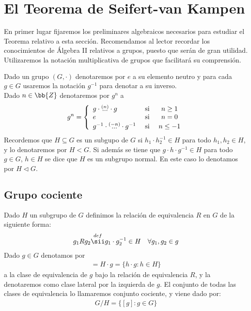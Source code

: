 \section{El Teorema de Seifert-van Kampen}

En primer lugar fijaremos los preliminares algebraicos necesarios para estudiar el Teorema relativo a esta sección. Recomendamos al lector recordar los conocimientos de Álgebra II relativos a grupos, puesto que serán de gran utilidad. Utilizaremos la notación multiplicativa de grupos que facilitará su comprensión.

\begin{notacion}
    Dado un grupo $(G, \cdot)$ denotaremos por $e$ a su elemento neutro y para cada $g\in G$ usaremos la notación $g^{-1}$ para denotar a su inverso.\\

    Dado $n\in \bb{Z}$ denotaremos por $g^n$ a 
    \begin{gather*}
        g^n = \left\{
            \begin{array}{l c c}
                g\cdot \overset{(n)}{...} \cdot g & \text{ si } & n\geq 1\\
                e & \text{ si } & n=0\\
                g^{-1}\cdot \overset{(-n)}{...} \cdot g^{-1} & \text{ si } & n\leq -1
            \end{array}
        \right.
    \end{gather*}
    Recordemos que $H\subseteq G$ es un subgupo de $G$ si $h_1\cdot h_2^{-1}\in H$ para todo $h_1,h_2\in H$, y  lo denotaremos por $H<G$. Si además se tiene que $g\cdot h \cdot g^{-1}\in H$ para todo $g\in G$, $h \in H$ se dice que $H$ es un subgrupo normal. En este caso lo denotamos por $H \lhd G$.
\end{notacion}

\subsection{Grupo cociente}

Dado $H$ un subgrupo de $G$ definimos la relación de equivalencia $R$ en $G$ de la siguiente forma:
\begin{gather*}
    g_1 R g_2 \overset{def}{\sii} g_1\cdot g_2^{-1}\in H\ \ \ \forall g_1,g_2\in g
\end{gather*}
Dado $g\in G$ denotamos por 
\begin{gather*}
    [g]=H\cdot g = \{h\cdot g : h\in H\}
\end{gather*}
a la clase de equivalencia de $g$ bajo la relación de equivalencia $R$, y la denotaremos como clase lateral por la izquierda de $g$. El conjunto de todas las clases de equivalencia lo llamaremos conjunto cociente, y viene dado por:
\begin{gather*}
    G/H = \{[g] : g\in G\}
\end{gather*}

